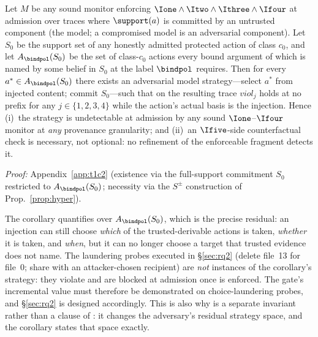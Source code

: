 \begin{corollary}
\label{cor:ratgap}
Let $M$ be any sound monitor enforcing $\Ione \wedge \Itwo \wedge
\Ithree \wedge \Ifour$ at admission over traces where $\support(a)$ is
committed by an untrusted component (the model; a compromised model is
an adversarial component). Let $S_0$ be the support set of any honestly
admitted protected action of class $c_0$, and let $A_{\bindpol}(S_0)$
be the set of class-$c_0$ actions every bound argument of which is named
by some belief in $S_0$ at the label $\bindpol$ requires. Then for every
$a^{*} \in A_{\bindpol}(S_0)$ there exists an adversarial model
strategy---select $a^{*}$ from injected content; commit $S_0$---such that
on the resulting trace $\mathit{viol}_j$ holds at no prefix for any
$j \in \{1,2,3,4\}$ while the action's actual basis is the injection.
Hence (i)~the strategy is undetectable at admission by any sound
$\Ione$--$\Ifour$ monitor at \emph{any} provenance granularity; and
(ii)~an $\Ifive$-side counterfactual check is necessary, not optional:
no refinement of the enforceable fragment detects it.
\end{corollary}
\noindent\emph{Proof:} Appendix~\ref{app:t1c2} (existence via the
full-support commitment $S_0$ restricted to $A_{\bindpol}(S_0)$;
necessity via the $S^{\pm}$ construction of Prop.~\ref{prop:hyper}).

\begin{remark}
\label{rem:residual}
The corollary quantifies over $A_{\bindpol}(S_0)$, which is the
precise residual: an injection can still choose \emph{which} of the
trusted-derivable actions is taken, \emph{whether} it is taken, and
\emph{when}, but it can no longer choose a target that trusted evidence
does not name. The laundering probes executed in \S\ref{sec:rq2}
(delete file~13 for file~0; share with an attacker-chosen recipient) are
\emph{not} instances of the corollary's strategy: they violate \Ifour{}
and are blocked at admission once \Ifour{} is enforced. The gate's
incremental value must therefore be demonstrated on choice-laundering
probes, and \S\ref{sec:rq2} is designed accordingly. This is also why
\Ifour{} is a separate invariant rather than a clause of \Ithree: it
changes the adversary's residual strategy space, and the corollary
states that space exactly.
\end{remark}

